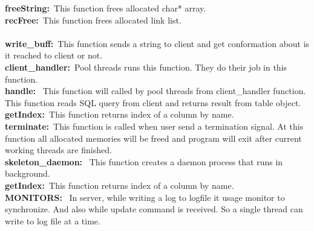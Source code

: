 \documentclass[a4 paper]{article}
\begin{document}
\textbf{freeString:}\newline\
\phantom{beta}This function frees allocated char* array.
\newline\\
\textbf{recFree:}\newline\
\phantom{beta}This function frees allocated link list.
\newline\\
\newline\\
\textbf{write\_buff:}\newline\
\phantom{beta}This function sends a string to client and get conformation about is it reached to  client or not.
\newline\\
\textbf{client\_handler:}\newline\
\phantom{beta}Pool threads runs this function. They do their job in this function.
\newline\\
\textbf{handle:}\newline\
\phantom{beta} This function will called by pool threads from client\_handler function. This function reads SQL query from client and returns result from table object.
\newline\\
\textbf{getIndex:}\newline\
\phantom{beta}This function returns index of a column by name.
\newline\\
\textbf{terminate:}\newline\
\phantom{beta}This function is called when user send a termination signal. At this function all allocated memories will be freed and program will exit after current working threads are finished.
\newline\\
\textbf{skeleton\_daemon:}\newline\
\phantom{beta} This function creates a daemon process that runs in background.
\newline\\
\textbf{getIndex:}\newline\
\phantom{beta}This function returns index of a column by name.
\newline\\
\textbf{MONITORS:}\newline\
\phantom{beta} In server, while writing a log to logfile it usage monitor to synchronize. And also while update command is received. So a single thread can write to log file at a time.
\end{document}
